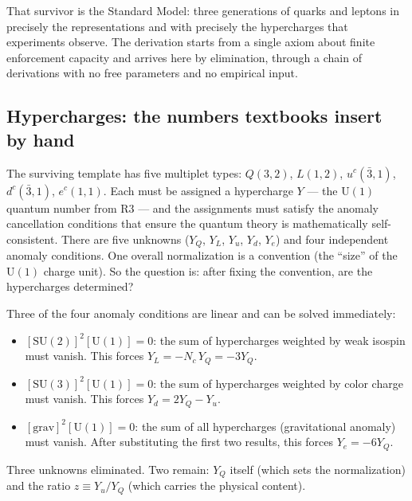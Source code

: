\documentclass[11pt]{article}
\newenvironment{varlist}{\begin{itemize}[nosep,leftmargin=2em]}{\end{itemize}}
\newcommand{\SU}{\mathrm{SU}}
\newcommand{\U}{\mathrm{U}}
\begin{document}
That survivor is the Standard Model: three generations of quarks and leptons in precisely the representations and with precisely the hypercharges that experiments observe.  The derivation starts from a single axiom about finite enforcement capacity and arrives here by elimination, through a chain of derivations with no free parameters and no empirical input.

\subsection{Hypercharges: the numbers textbooks insert by hand}

The surviving template has five multiplet types: $Q(3,2)$, $L(1,2)$, $u^c(\bar{3},1)$, $d^c(\bar{3},1)$, $e^c(1,1)$.  Each must be assigned a hypercharge $Y$ --- the $\U(1)$ quantum number from R3 --- and the assignments must satisfy the anomaly cancellation conditions that ensure the quantum theory is mathematically self-consistent.  There are five unknowns ($Y_Q$, $Y_L$, $Y_u$, $Y_d$, $Y_e$) and four independent anomaly conditions.  One overall normalization is a convention (the ``size'' of the $\U(1)$ charge unit).  So the question is: after fixing the convention, are the hypercharges determined?

Three of the four anomaly conditions are linear and can be solved immediately:

\begin{varlist}
\item $[\SU(2)]^2[\U(1)] = 0$: the sum of hypercharges weighted by weak isospin must vanish.  This forces $Y_L = -N_c \, Y_Q = -3 Y_Q$.
\item $[\SU(3)]^2[\U(1)] = 0$: the sum of hypercharges weighted by color charge must vanish.  This forces $Y_d = 2Y_Q - Y_u$.
\item $[\mathrm{grav}]^2[\U(1)] = 0$: the sum of all hypercharges (gravitational anomaly) must vanish.  After substituting the first two results, this forces $Y_e = -6 Y_Q$.
\end{varlist}

\noindent Three unknowns eliminated.  Two remain: $Y_Q$ itself (which sets the normalization) and the ratio $z \equiv Y_u / Y_Q$ (which carries the physical content).
\end{document}

